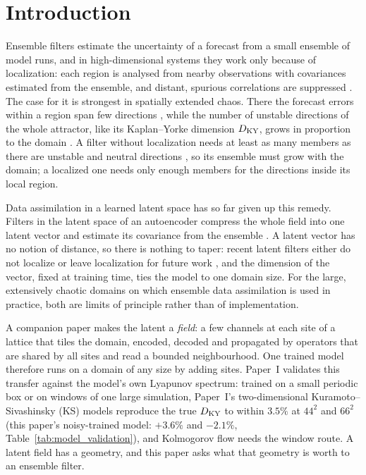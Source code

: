 \section{Introduction}
\label{sec:introduction}

Ensemble filters estimate the uncertainty of a forecast from a small
ensemble of model runs, and in high-dimensional systems they work only
because of localization: each region is analysed from nearby observations
with covariances estimated from the ensemble, and distant, spurious
correlations are suppressed \citep{houtekamermitchell2001,ott2004,hunt2007}.
The case for it is strongest in spatially extended chaos. There the forecast
errors within a region span few directions \citep{patil2001}, while the
number of unstable directions of the whole attractor, like its
Kaplan--Yorke dimension $D_{\mathrm{KY}}$, grows in proportion to the domain
\citep{ruelle1982,manneville1985,egolfgreenside1994}. A filter without
localization needs at least as many members as there are unstable and
neutral directions \citep{bocquetcarrassi2017,takeda2026}, so its ensemble
must grow with the domain; a localized one needs only enough members for
the directions inside its local region.

Data assimilation in a learned latent space has so far given up this
remedy. Filters in the latent space of an autoencoder compress the whole
field into one latent vector and estimate its covariance from the ensemble
\citep{peyron2021,chen2023roadenkf,pasmans2025,tong2026laeenkf,si2025latentensf}.
A latent vector has no notion of distance, so there is nothing to taper:
recent latent filters either do not localize or leave localization for
future work \citep{chen2023roadenkf,tong2026laeenkf}, and the dimension of
the vector, fixed at training time, ties the model to one domain size. For
the large, extensively chaotic domains on which ensemble data
assimilation is used in practice, both are limits of principle rather than
of implementation.

A companion paper \citep[hereafter Paper~I]{jones2026transfer} makes the latent a
\emph{field}: a few channels at each site of a lattice that tiles the
domain, encoded, decoded and propagated by operators that are shared by
all sites and read a bounded neighbourhood. One trained model therefore
runs on a domain of any size by adding sites. Paper~I validates this
transfer against the model's own Lyapunov spectrum: trained on a small periodic
box or on windows of one large simulation, Paper~I's two-dimensional Kuramoto--Sivashinsky (KS)
models reproduce the true $D_{\mathrm{KY}}$ to within $3.5\%$ at $44^2$ and $66^2$ (this paper's noisy-trained model:
$+3.6\%$ and $-2.1\%$, Table~\ref{tab:model_validation}), and
Kolmogorov flow needs the window route. A latent field has a geometry, and this paper asks
what that geometry is worth to an ensemble filter.

